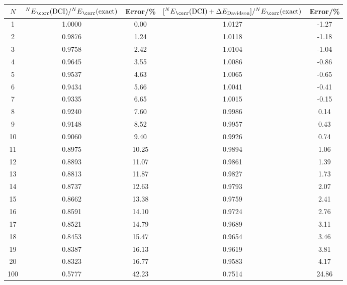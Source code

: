 \documentclass[a4paper]{article}
\begin{document}
\begin{table}[H]
	\begin{tabular}{ccccc}
		\hline
		\specialrule{0em}{1pt}{2pt}
		 $ N $ & $ {^N E}_{\corr}(\text{DCI}) / {^N E}_{\corr}(\text{exact}) $      & Error/\% & $ [{^N E}_{\corr}(\text{DCI}) + \Delta E_{\text{Davidson}}] / {^N E}_{\corr}(\text{exact}) $ & Error/\% \\ \hline
	    1 & 1.0000	 & 0.00	& 1.0127	& -1.27  \\
		2 & 0.9876     & 1.24	& 1.0118	& -1.18  \\
		3 & 0.9758	 & 2.42	& 1.0104	& -1.04  \\
		4 & 0.9645	 & 3.55	& 1.0086	& -0.86 \\
		5 & 0.9537	 & 4.63	& 1.0065	& -0.65 \\
		6 & 0.9434	 & 5.66	& 1.0041	& -0.41 \\
		7 & 0.9335	 & 6.65	& 1.0015	& -0.15 \\
		8 & 0.9240	 & 7.60	& 0.9986	& 0.14  \\
		9 & 0.9148	 & 8.52	& 0.9957	& 0.43  \\
		10 & 0.9060	 & 9.40	& 0.9926	& 0.74  \\
		11 & 0.8975	 & 10.25	& 0.9894	& 1.06   \\
		12 & 0.8893	 & 11.07	& 0.9861	& 1.39   \\
		13 & 0.8813	 & 11.87	& 0.9827	& 1.73   \\
		14 & 0.8737	 & 12.63	& 0.9793	& 2.07   \\
		15 & 0.8662	 & 13.38	& 0.9759	& 2.41   \\
		16 & 0.8591	 & 14.10	& 0.9724	& 2.76   \\
		17 & 0.8521	 & 14.79	& 0.9689	& 3.11   \\
		18 & 0.8453	 & 15.47	& 0.9654	& 3.46   \\
		19 & 0.8387	 & 16.13	& 0.9619	& 3.81   \\
		20 & 0.8323	 & 16.77	& 0.9583	& 4.17   \\
		100 & 0.5777 & 42.23    & 0.7514    & 24.86  \\
		\hline
	\end{tabular}
\end{table}
\end{document}
